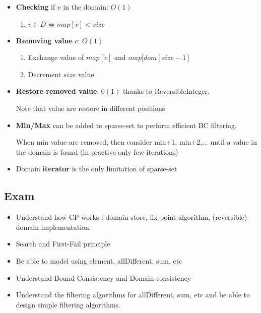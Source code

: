 \begin{itemize}
    \item \textbf{Checking} if $v$ in the domain: $O(1)$
        \begin{enumerate}
        \item $v \in D \Leftrightarrow map[v] < size$
            \end{enumerate}

    \item \textbf{Removing value} $c$: $O(1)$
        \begin{enumerate}
        \item Exchange value of $map[c]$  and  $map[dom[size-1]$
                \item Decrement $size$ value
            \end{enumerate}

        \item \textbf{Restore removed value}: $0(1)$ thanks to
            ReversibleInteger.

            Note that value are restore in different positions

    \item \textbf{Min/Max} can be added to sparse-set to perform
        efficient BC filtering. 

        When min value are removed, then consider min+1, min+2,...
        until a value in the domain is found (in practive only few
        iterations)

    \item Domain \textbf{iterator} is the only limitation of sparse-set
\end{itemize}



\subsection{Exam}
\begin{itemize}
    \item  Understand how CP works : domain store, fix-point
        algorithm, (reversible) domain implementation.
    \item  Search and First-Fail principle
    \item  Be able to model using element, allDifferent, sum, etc
    \item  Understand Bound-Consistency and Domain
        consistency
    \item  Understand the filtering algorithms for allDifferent, sum,
        etc and be able to design simple filtering algorithms.
\end{itemize}


